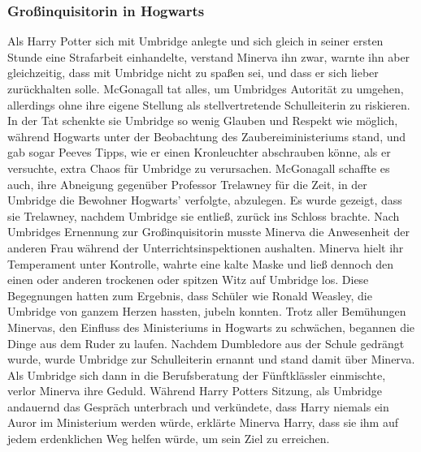 \documentclass[a4paper, 10pt]{article}
\begin{document}
\subsubsection*{\large Großinquisitorin in Hogwarts}
Als Harry Potter sich mit Umbridge anlegte und sich gleich in seiner ersten Stunde eine Strafarbeit einhandelte, verstand Minerva ihn zwar, warnte ihn aber gleichzeitig, dass mit Umbridge nicht zu spaßen sei, und dass er sich lieber zurückhalten solle. McGonagall tat alles, um Umbridges Autorität zu umgehen, allerdings ohne ihre eigene Stellung als stellvertretende Schulleiterin zu riskieren. In der Tat schenkte sie Umbridge so wenig Glauben und Respekt wie möglich, während Hogwarts unter der Beobachtung des Zaubereiministeriums stand, und gab sogar Peeves Tipps, wie er einen Kronleuchter abschrauben könne, als er versuchte, extra Chaos für Umbridge zu verursachen. McGonagall schaffte es auch, ihre Abneigung gegenüber Professor Trelawney für die Zeit, in der Umbridge die Bewohner Hogwarts' verfolgte, abzulegen. Es wurde gezeigt, dass sie Trelawney, nachdem Umbridge sie entließ, zurück ins Schloss brachte.
\vspace{10pt}
\newline
Nach Umbridges Ernennung zur Großinquisitorin musste Minerva die Anwesenheit der anderen Frau während der Unterrichtsinspektionen aushalten. Minerva hielt ihr Temperament unter Kontrolle, wahrte eine kalte Maske und ließ dennoch den einen oder anderen trockenen oder spitzen Witz auf Umbridge los. Diese Begegnungen hatten zum Ergebnis, dass Schüler wie Ronald Weasley, die Umbridge von ganzem Herzen hassten, jubeln konnten.
\vspace{10pt}
\newline
Trotz aller Bemühungen Minervas, den Einfluss des Ministeriums in Hogwarts zu schwächen, begannen die Dinge aus dem Ruder zu laufen. Nachdem Dumbledore aus der Schule gedrängt wurde, wurde Umbridge zur Schulleiterin ernannt und stand damit über Minerva. Als Umbridge sich dann in die Berufsberatung der Fünftklässler einmischte, verlor Minerva ihre Geduld. Während Harry Potters Sitzung, als Umbridge andauernd das Gespräch unterbrach und verkündete, dass Harry niemals ein Auror im Ministerium werden würde, erklärte Minerva Harry, dass sie ihm auf jedem erdenklichen Weg helfen würde, um sein Ziel zu erreichen.
\end{document}
